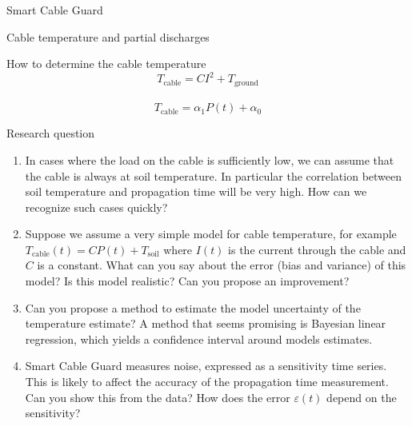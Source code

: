 \documentclass{beamer}
\begin{document}
	\begin{frame}{Smart Cable Guard}
	\end{frame}
	
	\begin{frame}{Cable temperature and partial discharges}
	\end{frame}
	
	\begin{frame}{How to determine the cable temperature}
		$$T_\text{cable} = C I^2 + T_\text{ground}$$
		~\\
		$$T_\text{cable} = \alpha_1 P(t) + \alpha_0$$
	\end{frame}
	
	\begin{frame}{Research question}
		\footnotesize
		\begin{enumerate}
			\item In cases where the load on the cable is sufficiently low, we can assume that the cable is always at soil temperature. In particular the correlation between soil temperature and propagation time will be very high. How can we recognize such cases quickly?
			\item Suppose we assume a very simple model for cable temperature, for example $T_\text{cable}(t) = C P(t) + T_\text{soil}$ where $I(t)$ is the current through the cable and $C$ is a constant. What can you say about the error (bias and variance) of this model? Is this model realistic? Can you propose an improvement?
			\item Can you propose a method to estimate the model uncertainty of the temperature estimate? A method that seems promising is Bayesian linear regression, which yields a confidence interval around models estimates.
			\item Smart Cable Guard measures noise, expressed as a sensitivity time series. This is likely to affect the accuracy of the propagation time measurement. Can you show this from the data? How does the error $\varepsilon(t)$ depend on the sensitivity?
		\end{enumerate}
	\end{frame}
	
\end{document}
